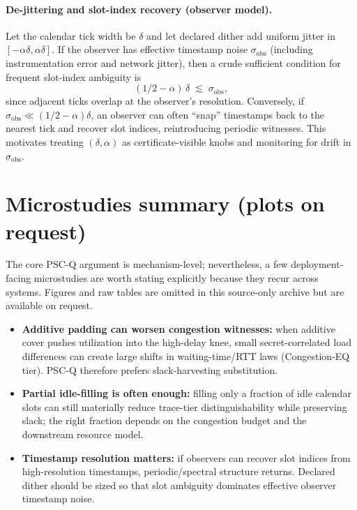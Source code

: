 \documentclass[11pt]{article}
\theoremstyle{definition}
\theoremstyle{remark}
\begin{document}
\paragraph{De-jittering and slot-index recovery (observer model).}
Let the calendar tick width be $\delta$ and let declared dither add uniform jitter in $[-\alpha\delta,\alpha\delta]$.
If the observer has effective timestamp noise $\sigma_{\mathrm{obs}}$ (including instrumentation error and network jitter),
then a crude sufficient condition for frequent slot-index ambiguity is
\[
(1/2-\alpha)\,\delta \;\lesssim\; \sigma_{\mathrm{obs}},
\]
since adjacent ticks overlap at the observer's resolution.
Conversely, if $\sigma_{\mathrm{obs}}\ll (1/2-\alpha)\delta$, an observer can often ``snap'' timestamps back to the nearest tick
and recover slot indices, reintroducing periodic witnesses. This motivates treating $(\delta,\alpha)$ as certificate-visible knobs
and monitoring for drift in $\sigma_{\mathrm{obs}}$.


\section{Microstudies summary (plots on request)}
\label{sec:microstudies-summary}
The core PSC-Q argument is mechanism-level; nevertheless, a few deployment-facing microstudies are worth stating explicitly because they recur across systems.
Figures and raw tables are omitted in this source-only archive but are available on request.
\begin{itemize}[leftmargin=*]
\item \textbf{Additive padding can worsen congestion witnesses:} when additive cover pushes utilization into the high-delay knee, small secret-correlated load differences can create large shifts in waiting-time/RTT laws (Congestion-EQ tier). PSC-Q therefore prefers slack-harvesting substitution.
\item \textbf{Partial idle-filling is often enough:} filling only a fraction of idle calendar slots can still materially reduce trace-tier distinguishability while preserving slack; the right fraction depends on the congestion budget and the downstream resource model.
\item \textbf{Timestamp resolution matters:} if observers can recover slot indices from high-resolution timestamps, periodic/spectral structure returns. Declared dither should be sized so that slot ambiguity dominates effective observer timestamp noise.
\end{itemize}
\end{document}
